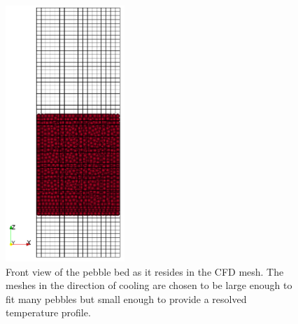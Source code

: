 
\begin{figure}[t]
	\centering
	\includegraphics[width=0.4\textwidth]{figures/y-side-view}
    \caption{Front view of the pebble bed as it resides in the CFD mesh. The meshes in the direction of cooling are chosen to be large enough to fit many pebbles but small enough to provide a resolved temperature profile.}\label{fig:cfdem-domain-y}
\end{figure}


